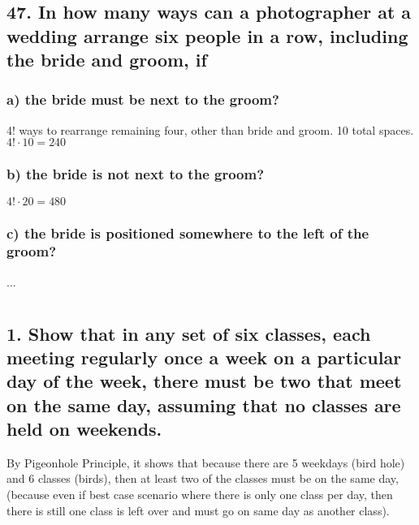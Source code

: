 \documentclass[11pt, oneside]{article} %
\numberwithin{equation}{section} %
\numberwithin{figure}{section} %
\numberwithin{table}{section} %
\begin{document}

\subsection{47. In how many ways can a photographer at a wedding arrange six people in a row, including the bride and groom, if}
\subsubsection{a) the bride must be next to the groom?}
4! ways to rearrange remaining four, other than bride and groom. 10 total spaces.\\
$4! \cdot 10 = 240$
 
\subsubsection{b) the bride is not next to the groom?}
$4! \cdot 20 = 480$

\subsubsection{c) the bride is positioned somewhere to the left of the groom?}
...


\section{}
\subsection{1. Show that in any set of six classes, each meeting regularly once a week on a particular day of the week, there must be two that meet on the same day, assuming that no classes are held on weekends.}
By Pigeonhole Principle, it shows that because there are 5 weekdays (bird hole) and 6 classes (birds), then at least two of the classes must be on the same day, (because even if best case scenario where there is only one class per day, then there is still one class is left over and must go on same day as another class).
\end{document}
